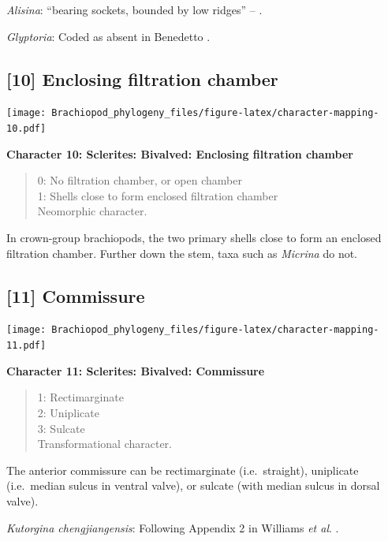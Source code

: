 \documentclass[openany]{book}
\theoremstyle{definition}
\theoremstyle{definition}
\theoremstyle{definition}
\theoremstyle{remark}
\begin{document}
\emph{Alisina}: ``bearing sockets, bounded by low ridges'' --
\citet{Williams2000BrachiopodaLinguliformea}.

\emph{Glyptoria}: Coded as absent in Benedetto
\citeyearpar{Benedetto2009iChaniella}.

\hypertarget{enclosing-filtration-chamber}{%
\subsection*{{[}10{]} Enclosing filtration
chamber}\label{enclosing-filtration-chamber}}

\texttt{[image: Brachiopod\_phylogeny\_files/figure-latex/character-mapping-10.pdf]}

\textbf{Character 10: Sclerites: Bivalved: Enclosing filtration chamber}

\begin{quote}
0: No filtration chamber, or open chamber\\
1: Shells close to form enclosed filtration chamber\\
Neomorphic character.
\end{quote}

In crown-group brachiopods, the two primary shells close to form an
enclosed filtration chamber. Further down the stem, taxa such as
\emph{Micrina} do not.

\hypertarget{commissure}{%
\subsection*{{[}11{]} Commissure}\label{commissure}}

\texttt{[image: Brachiopod\_phylogeny\_files/figure-latex/character-mapping-11.pdf]}

\textbf{Character 11: Sclerites: Bivalved: Commissure}

\begin{quote}
1: Rectimarginate\\
2: Uniplicate\\
3: Sulcate\\
Transformational character.
\end{quote}

The anterior commissure can be rectimarginate (i.e.~straight),
uniplicate (i.e.~median sulcus in ventral valve), or sulcate (with
median sulcus in dorsal valve).

\emph{Kutorgina chengjiangensis}: Following Appendix 2 in Williams
\emph{et al}. \citeyearpar{Williams1998Thediversity}.
\end{document}
